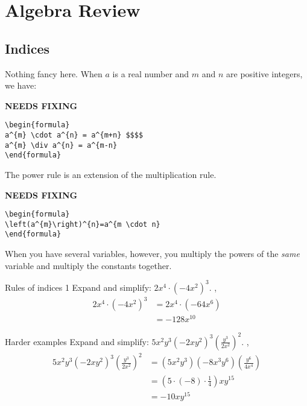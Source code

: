 \documentclass[../../main.tex]{subfiles}
\begin{document}
\chapter{Algebra Review}

\section {Indices}
Nothing fancy here.
When $a$ is a real number and $m$ and $n$ are positive integers, we have:

{\hfill\Large\bfseries NEEDS FIXING\hfill}
\begin{lstlisting}
\begin{formula}
a^{m} \cdot a^{n} = a^{m+n} $$$$
a^{m} \div a^{n} = a^{m-n}
\end{formula}
 \end{lstlisting} %
The power rule is an extension of the multiplication rule.


{\hfill\Large\bfseries NEEDS FIXING\hfill}
\begin{lstlisting}
\begin{formula}
\left(a^{m}\right)^{n}=a^{m \cdot n}
\end{formula}
 \end{lstlisting}

When you have several variables, however, you multiply the powers of the \textit{same} variable and multiply the constants together.
\begin{example}{Rules of indices 1}
Expand and simplify: $2x^4\cdot(-4x^2)^3$.
\sep
\begin{align}
    2x^4\cdot(-4x^2)^3 & = 2x^4\cdot\left(-64x^6\right)\\&= -128x^{10}
\end{align}
\end{example}
\begin{example}{Harder examples}
Expand and simplify: $5x^{2}y^{3}\left(-2xy^{2}\right)^{3}\left(\frac {y^{3}}{2x^{2}}\right)^{2}$.
\sep
\begin{align}
5x^{2}y^{3}\left(-2xy^{2}\right)^{3}\left(\frac{y^3}{2x^2}\right)^{2}&= (5x^{2}y^{3})\left(-8x^{3}y^{6}\right)\left(\frac{y^{6}}{4x^{4}}\right) \\
    &= \left(5\cdot(-8)\cdot\frac{1}{4}\right)xy^{15}\\
    &=-10xy^{15} 
\end{align}
\end{example}
\end{document}
